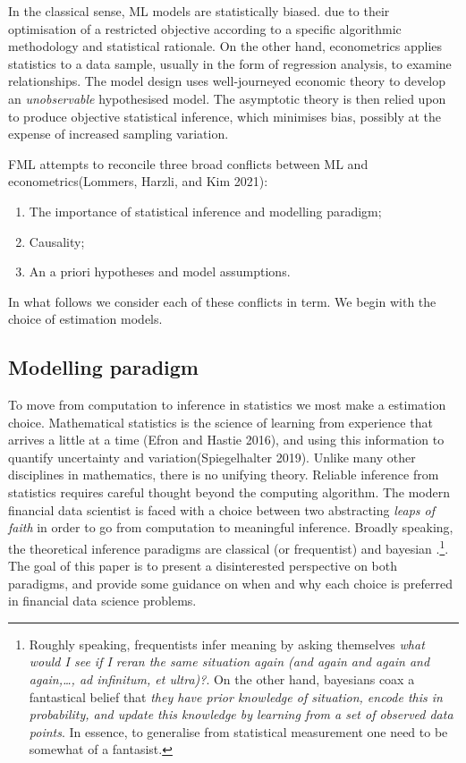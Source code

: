 \documentclass{article}
\begin{document}
In the classical sense, ML models are statistically biased. due to their
optimisation of a restricted objective according to a specific
algorithmic methodology and statistical rationale. On the other hand,
econometrics applies statistics to a data sample, usually in the form of
regression analysis, to examine relationships. The model design uses
well-journeyed economic theory to develop an \emph{unobservable}
hypothesised model. The asymptotic theory is then relied upon to produce
objective statistical inference, which minimises bias, possibly at the
expense of increased sampling variation.

FML attempts to reconcile three broad conflicts between ML and
econometrics(Lommers, Harzli, and Kim 2021):

\begin{enumerate}
\def\labelenumi{\arabic{enumi}.}
\tightlist
\item
  The importance of statistical inference and modelling paradigm;
\item
  Causality;
\item
  An a priori hypotheses and model assumptions.
\end{enumerate}

In what follows we consider each of these conflicts in term. We begin
with the choice of estimation models.

\hypertarget{modelling-paradigm}{%
\subsection{Modelling paradigm}\label{modelling-paradigm}}

To move from computation to inference in statistics we most make a
estimation choice. Mathematical statistics is the science of learning
from experience that arrives a little at a time (Efron and Hastie 2016),
and using this information to quantify uncertainty and
variation(Spiegelhalter 2019). Unlike many other disciplines in
mathematics, there is no unifying theory. Reliable inference from
statistics requires careful thought beyond the computing algorithm. The
modern financial data scientist is faced with a choice between two
abstracting \emph{leaps of faith} in order to go from computation to
meaningful inference. Broadly speaking, the theoretical inference
paradigms are classical (or frequentist) and bayesian .\footnote{Roughly
  speaking, frequentists infer meaning by asking themselves \emph{what
  would I see if I reran the same situation again (and again and again
  and again,\ldots, ad infinitum, et ultra)?}. On the other hand,
  bayesians coax a fantastical belief that \emph{they have prior
  knowledge of situation, encode this in probability, and update this
  knowledge by learning from a set of observed data points}. In essence,
  to generalise from statistical measurement one need to be somewhat of
  a fantasist.}. The goal of this paper is to present a disinterested
perspective on both paradigms, and provide some guidance on when and why
each choice is preferred in financial data science problems.
\end{document}
